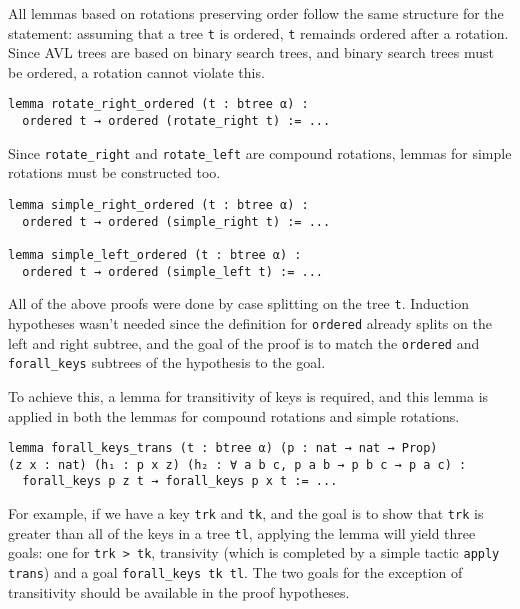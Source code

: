 All lemmas based on rotations preserving order follow the same structure for the statement: assuming that a tree \lstinline{t} is ordered, \lstinline{t} remainds ordered after a rotation. Since AVL trees are based on binary search trees, and binary search trees must be ordered, a rotation cannot violate this. 

\begin{lstlisting}
lemma rotate_right_ordered (t : btree α) :
  ordered t → ordered (rotate_right t) := ...
\end{lstlisting}

Since \lstinline{rotate_right} and \lstinline{rotate_left} are compound rotations, lemmas for simple rotations must be constructed too. 

\begin{lstlisting}
lemma simple_right_ordered (t : btree α) :
  ordered t → ordered (simple_right t) := ...

lemma simple_left_ordered (t : btree α) :
  ordered t → ordered (simple_left t) := ...
\end{lstlisting}

All of the above proofs were done by case splitting on the tree \lstinline{t}. Induction hypotheses wasn't needed since the definition for \lstinline{ordered} already splits on the left and right subtree, and the goal of the proof is to match the \lstinline{ordered} and \lstinline{forall_keys} subtrees of the hypothesis to the goal. 

To achieve this, a lemma for transitivity of keys is required, and this lemma is applied in both the lemmas for compound rotations and simple rotations.

\begin{lstlisting}
lemma forall_keys_trans (t : btree α) (p : nat → nat → Prop) 
(z x : nat) (h₁ : p x z) (h₂ : ∀ a b c, p a b → p b c → p a c) :
  forall_keys p z t → forall_keys p x t := ...
\end{lstlisting}

For example, if we have a key \lstinline{trk} and \lstinline{tk}, and the goal is to show that \lstinline{trk} is greater than all of the keys in a tree \lstinline{tl}, applying the lemma will yield three goals: one for \lstinline{trk > tk}, transivity (which is completed by a simple tactic \lstinline{apply trans}) and a goal \lstinline{forall_keys tk tl}. The two goals for the exception of transitivity should be available in the proof hypotheses. 